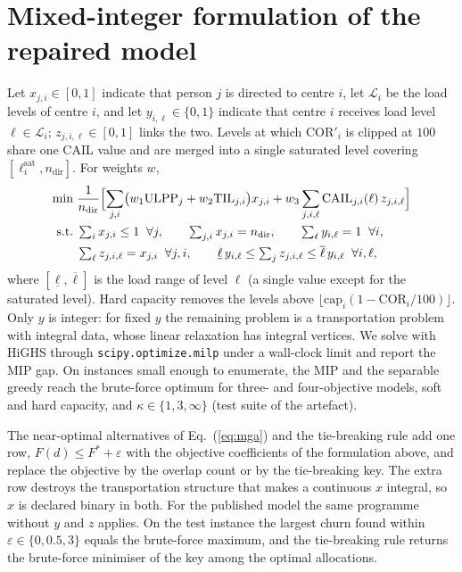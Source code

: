 \documentclass[systems,article,submit,moreauthors,pdftex]{Definitions/mdpi}
\begin{document}
\section{Mixed-integer formulation of the repaired model}\label{app:mip}
Let $x_{j,i} \in [0,1]$ indicate that person $j$ is directed to centre $i$, let
$\mathcal{L}_i$ be the load levels of centre $i$, and let $y_{i,\ell} \in \{0,1\}$ indicate
that centre $i$ receives load level $\ell \in \mathcal{L}_i$; $z_{j,i,\ell} \in [0,1]$ links
the two. Levels at which $\mathrm{COR}'_i$ is clipped at $100$ share one CAIL value and are
merged into a single saturated level covering $[\ell^{\mathrm{sat}}_i, n_{\mathrm{dir}}]$.
For weights $w$,
\begin{align}
\min\; & \frac{1}{n_{\mathrm{dir}}}\Bigl[\sum_{j,i} \bigl(w_1\mathrm{ULPP}_j + w_2\mathrm{TIL}_{j,i}\bigr)x_{j,i}
 + w_3 \sum_{j,i,\ell} \mathrm{CAIL}_{j,i}(\ell)\, z_{j,i,\ell}\Bigr] \\
\text{s.t.}\; & \textstyle\sum_i x_{j,i} \le 1 \;\; \forall j, \qquad \sum_{j,i} x_{j,i} = n_{\mathrm{dir}},
 \qquad \sum_{\ell} y_{i,\ell} = 1 \;\; \forall i,\\
& \textstyle\sum_{\ell} z_{j,i,\ell} = x_{j,i} \;\; \forall j,i, \qquad
 \underline{\ell}\, y_{i,\ell} \le \sum_j z_{j,i,\ell} \le \overline{\ell}\, y_{i,\ell} \;\; \forall i,\ell,
\end{align}
where $[\underline{\ell}, \overline{\ell}]$ is the load range of level $\ell$ (a single value
except for the saturated level). Hard capacity removes the levels above
$\lfloor \mathrm{cap}_i (1 - \mathrm{COR}_i/100)\rfloor$. Only $y$ is integer: for fixed $y$
the remaining problem is a transportation problem with integral data, whose linear relaxation
has integral vertices. We solve with HiGHS through \texttt{scipy.optimize.milp} under a
wall-clock limit and report the MIP gap. On instances small enough to enumerate, the MIP and
the separable greedy reach the brute-force optimum for three- and four-objective models, soft
and hard capacity, and $\kappa \in \{1, 3, \infty\}$ (test suite of the artefact).

The near-optimal alternatives of Eq.~(\ref{eq:mga}) and the tie-breaking rule add one row,
$F(d) \le F^\ast + \varepsilon$ with the objective coefficients of the formulation above, and
replace the objective by the overlap count or by the tie-breaking key. The extra row destroys the
transportation structure that makes a continuous $x$ integral, so $x$ is declared binary in both.
For the published model the same programme without $y$ and $z$ applies. On the test instance the
largest churn found within $\varepsilon \in \{0, 0.5, 3\}$ equals the brute-force maximum, and the
tie-breaking rule returns the brute-force minimiser of the key among the optimal allocations.
\end{document}
